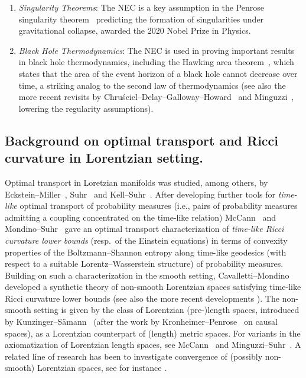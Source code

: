 \documentclass[12pt,a4paper]{amsart}
\theoremstyle{plain}
\theoremstyle{definition}
\numberwithin{equation}{section}
\begin{document}
\begin{enumerate}
\item \emph{Singularity Theorems}: The NEC is a key assumption in the Penrose singularity theorem~\cite{Penrose65} predicting the formation of singularities under gravitational collapse, awarded the 2020 Nobel Prize in Physics.

\item \emph{Black Hole Thermodynamics}: The NEC is used in proving important results in black hole thermodynamics, including the Hawking area theorem~\cite{Haw71}, which states that the area of the event horizon of a black hole cannot decrease over time, a striking analog to the second law of thermodynamics (see also the more recent revisits by Chru{\'s}ciel--Delay--Galloway--Howard~\cite{CDGH-AHP-2001} and Minguzzi~\cite{MinguzziCMP15}, lowering the regularity assumptions).   
\end{enumerate}


\subsection*{Background on optimal transport and Ricci curvature in Lorentzian setting.}


Optimal transport in Loretzian manifolds was studied, among others, by
Eckstein--Miller~\cite{EM17}, Suhr~\cite{Suhr} and
Kell--Suhr~\cite{KellSuhr}. After developing  further tools for
\emph{time-like} optimal transport of probability measures (i.e.,
pairs of probability measures admitting a coupling concentrated on the
time-like relation) McCann~\cite{McCann} and Mondino--Suhr~\cite{MoSu}
gave an optimal transport characterization of \emph{time-like Ricci
  curvature lower bounds} (resp.\ of the Einstein equations) in terms of convexity properties of the Boltzmann--Shannon entropy along time-like geodesics (with respect to a suitable Lorentz--Wasserstein structure) of probability measures. Building on such a characterization in the smooth setting, Cavalletti--Mondino~\cite{CaMo:20} developed a synthetic theory of non-smooth Lorentzian spaces satisfying time-like Ricci curvature lower bounds  (see also the more recent developments \cite{Braun,Braun-Ohta,Braun-McCann}). The non-smooth setting is given by the class of Lorentzian (pre-)length spaces, introduced by Kunzinger--S\"amann~\cite{KS} (after the work by Kronheimer--Penrose~\cite{CausalSpace} on causal spaces), as a Lorentzian counterpart of (length) metric spaces. For variants in the axiomatization of Lorentzian length spaces, see McCann~\cite{McCann-NEC} and Minguzzi--Suhr~\cite{Minguzzi-Suhr}. 
A related line of research has been to investigate convergence of (possibly non-smooth) Lorentzian spaces, see for instance \cite{Sormani-Vega,Allen-Burtscher,Kunzinger-Steinbauer,Minguzzi-Suhr,Muller}.
\end{document}
